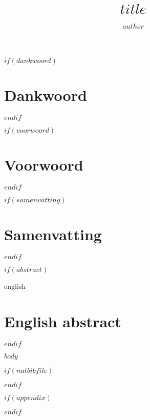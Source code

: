 \documentclass[9pt, twoside]{extreport}
\title{$title$}
\author{$author$}
\begin{document}
\maketitle
{}

$if(dankwoord)$
\chapter*{Dankwoord}

$endif$

$if(voorwoord)$
\chapter*{Voorwoord}

$endif$

$if(samenvatting)$
\chapter*{Samenvatting}

$endif$

$if(abstract)$
\begin{otherlanguage*}{english}
\chapter*{English abstract}

\end{otherlanguage*}
$endif$

\tableofcontents
{}
\newpage
{}

$body$

$if(natbibfile)$


$endif$

$if(appendix)$
\appendix

$endif$
\end{document}
